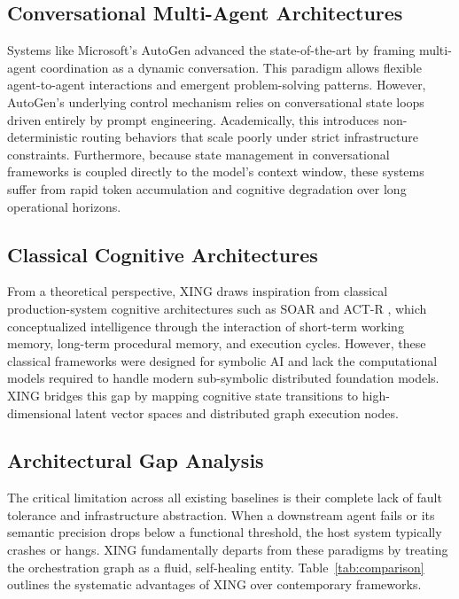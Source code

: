 \documentclass[conference]{IEEEtran}
\begin{document}
\subsection{Conversational Multi-Agent Architectures}

Systems like Microsoft's AutoGen \cite{autogen2024} advanced the state-of-the-art by framing multi-agent coordination as a dynamic conversation. This paradigm allows flexible agent-to-agent interactions and emergent problem-solving patterns. However, AutoGen's underlying control mechanism relies on conversational state loops driven entirely by prompt engineering. Academically, this introduces non-deterministic routing behaviors that scale poorly under strict infrastructure constraints. Furthermore, because state management in conversational frameworks is coupled directly to the model's context window, these systems suffer from rapid token accumulation and cognitive degradation over long operational horizons.

\subsection{Classical Cognitive Architectures}

From a theoretical perspective, XING draws inspiration from classical production-system cognitive architectures such as SOAR \cite{soar2012} and ACT-R \cite{actr2004}, which conceptualized intelligence through the interaction of short-term working memory, long-term procedural memory, and execution cycles. However, these classical frameworks were designed for symbolic AI and lack the computational models required to handle modern sub-symbolic distributed foundation models. XING bridges this gap by mapping cognitive state transitions to high-dimensional latent vector spaces and distributed graph execution nodes.

\subsection{Architectural Gap Analysis}

The critical limitation across all existing baselines is their complete lack of fault tolerance and infrastructure abstraction. When a downstream agent fails or its semantic precision drops below a functional threshold, the host system typically crashes or hangs. XING fundamentally departs from these paradigms by treating the orchestration graph as a fluid, self-healing entity. Table~\ref{tab:comparison} outlines the systematic advantages of XING over contemporary frameworks.
\end{document}
